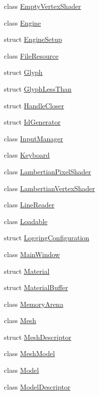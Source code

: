 \begin{DoxyCompactItemize}
\item 
class \hyperlink{classmage_1_1_empty_vertex_shader}{Empty\+Vertex\+Shader}
\item 
class \hyperlink{classmage_1_1_engine}{Engine}
\item 
struct \hyperlink{structmage_1_1_engine_setup}{Engine\+Setup}
\item 
class \hyperlink{classmage_1_1_file_resource}{File\+Resource}
\item 
struct \hyperlink{structmage_1_1_glyph}{Glyph}
\item 
struct \hyperlink{structmage_1_1_glyph_less_than}{Glyph\+Less\+Than}
\item 
struct \hyperlink{structmage_1_1_handle_closer}{Handle\+Closer}
\item 
struct \hyperlink{structmage_1_1_id_generator}{Id\+Generator}
\item 
class \hyperlink{classmage_1_1_input_manager}{Input\+Manager}
\item 
class \hyperlink{classmage_1_1_keyboard}{Keyboard}
\item 
class \hyperlink{classmage_1_1_lambertian_pixel_shader}{Lambertian\+Pixel\+Shader}
\item 
class \hyperlink{classmage_1_1_lambertian_vertex_shader}{Lambertian\+Vertex\+Shader}
\item 
class \hyperlink{classmage_1_1_line_reader}{Line\+Reader}
\item 
class \hyperlink{classmage_1_1_loadable}{Loadable}
\item 
struct \hyperlink{structmage_1_1_logging_configuration}{Logging\+Configuration}
\item 
class \hyperlink{classmage_1_1_main_window}{Main\+Window}
\item 
struct \hyperlink{structmage_1_1_material}{Material}
\item 
struct \hyperlink{structmage_1_1_material_buffer}{Material\+Buffer}
\item 
class \hyperlink{classmage_1_1_memory_arena}{Memory\+Arena}
\item 
class \hyperlink{classmage_1_1_mesh}{Mesh}
\item 
struct \hyperlink{structmage_1_1_mesh_descriptor}{Mesh\+Descriptor}
\item 
class \hyperlink{classmage_1_1_mesh_model}{Mesh\+Model}
\item 
class \hyperlink{classmage_1_1_model}{Model}
\item 
class \hyperlink{classmage_1_1_model_descriptor}{Model\+Descriptor}

\end{DoxyCompactItemize}
